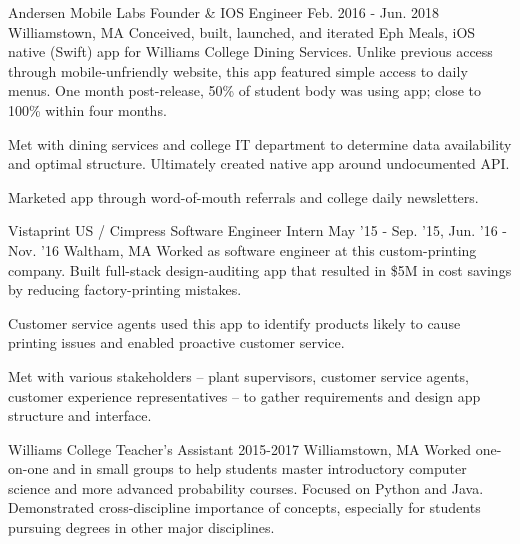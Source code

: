\begin{cventries}
\cventry
{Andersen Mobile Labs} %
{Founder \& IOS Engineer} %
{Feb. 2016 - Jun. 2018} %
{Williamstown, MA} %
{Conceived, built, launched, and iterated Eph Meals, iOS native (Swift) app for
Williams College Dining Services. Unlike previous access through
mobile-unfriendly website, this app featured simple access to daily menus. One
month post-release, 50\% of student body was using app; close to 100\% within
four months.}
{\begin{cvitems} %
\item Met with dining services and college IT department to determine data
availability and optimal structure. Ultimately created native app around
undocumented API.
\item Marketed app through word-of-mouth referrals and college daily
newsletters.
\end{cvitems}}

\cventry
{Vistaprint US / Cimpress} %
{Software Engineer Intern} %
{May '15 - Sep. '15, Jun. '16 - Nov. '16} %
{Waltham, MA} %
{Worked as software engineer at this custom-printing company. Built full-stack
design-auditing app that resulted in \$5M in cost savings by reducing
factory-printing mistakes.}
{\begin{cvitems} %
\item Customer service agents used this app to identify products likely to
cause printing issues and enabled proactive customer service.
\item Met with various stakeholders – plant supervisors, customer service
agents, customer experience representatives – to gather requirements and design
app structure and interface.
\end{cvitems}}

\cventry
{Williams College}
{Teacher's Assistant}
{2015-2017}
{Williamstown, MA}
{Worked one-on-one and in small groups to help students master introductory
computer science and more advanced probability courses. Focused on Python and
Java. Demonstrated cross-discipline importance of concepts, especially for
students pursuing degrees in other major disciplines.}
{}

\end{cventries}
